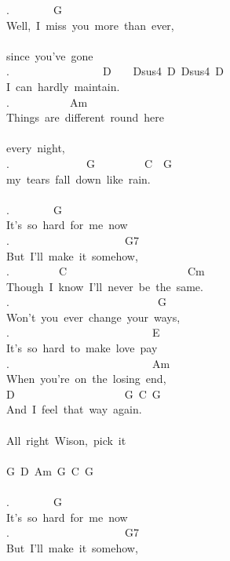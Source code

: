 {.\ \ \ \ \ \ \ \ G\\
Well,\ I\ miss\ you\ more\ than\ ever,\\
\\
since\ you've\ gone\\
.\ \ \ \ \ \ \ \ \ \ \ \ \ \ \ \ \ D\ \ \ \ Dsus4\ D\ Dsus4\ D\\
I\ can\ hardly\ maintain.\\
.\ \ \ \ \ \ \ \ \ \ \ Am\\
Things\ are\ different\ round\ here\\
\\
every\ night,\\
.\ \ \ \ \ \ \ \ \ \ \ \ \ \ G\ \ \ \ \ \ \ \ \ C\ \ G\\
my\ tears\ fall\ down\ like\ rain.\\
\\
.\ \ \ \ \ \ \ \ G\\
It's\ so\ hard\ for\ me\ now\\
.\ \ \ \ \ \ \ \ \ \ \ \ \ \ \ \ \ \ \ \ \ G7\\
But\ I'll\ make\ it\ somehow,\\
.\ \ \ \ \ \ \ \ \ C\ \ \ \ \ \ \ \ \ \ \ \ \ \ \ \ \ \ \ \ \ \ Cm\\
Though\ I\ know\ I'll\ never\ be\ the\ same.\\
.\ \ \ \ \ \ \ \ \ \ \ \ \ \ \ \ \ \ \ \ \ \ \ \ \ \ \ G\\
Won't\ you\ ever\ change\ your\ ways,\\
.\ \ \ \ \ \ \ \ \ \ \ \ \ \ \ \ \ \ \ \ \ \ \ \ \ \ E\\
It's\ so\ hard\ to\ make\ love\ pay\\
.\ \ \ \ \ \ \ \ \ \ \ \ \ \ \ \ \ \ \ \ \ \ \ \ \ \ Am\\
When\ you're\ on\ the\ losing\ end,\\
D\ \ \ \ \ \ \ \ \ \ \ \ \ \ \ \ \ \ \ \ G\ C\ G\\
And\ I\ feel\ that\ way\ again.\\
\\
\;All\ right\ Wison,\ pick\ it\;\\
\\
G\ D\ Am\ G\ C\ G\\
\\
.\ \ \ \ \ \ \ \ G\\
It's\ so\ hard\ for\ me\ now\\
.\ \ \ \ \ \ \ \ \ \ \ \ \ \ \ \ \ \ \ \ \ G7\\
But\ I'll\ make\ it\ somehow,\\
}
